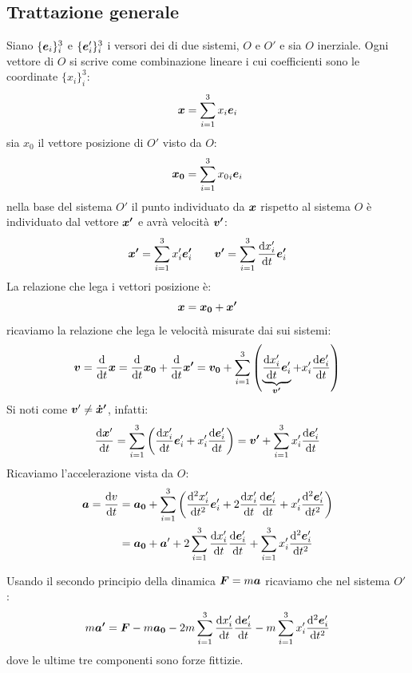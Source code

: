 \subsection{Trattazione generale}
Siano $\{\boldsymbol{e}_i\}_i^3$ e $\{\boldsymbol{e}'_i\}_i^3$ i versori dei di due sistemi, $O$ e $O'$ e sia $O$ inerziale. Ogni vettore di $O$ si scrive come combinazione lineare i cui coefficienti sono le coordinate $\{x_i\}_i^3$:
\[
  \boldsymbol{x}=\sum_{i=1}^3 x_i\boldsymbol{e}_i
\]
sia $x_0$ il vettore posizione di $O'$ visto da $O$:
\[
  \boldsymbol{x_0}=\sum_{i=1}^3 {x_0}_i \boldsymbol{e}_i
\]
nella base del sistema $O'$ il punto individuato da $\boldsymbol{x}$ rispetto al sistema $O$ è individuato dal vettore $\boldsymbol{x'}$ e avrà velocità $\boldsymbol{v'}$:
\[
  \boldsymbol{x'}=\sum_{i=1}^3 x'_i\boldsymbol{e'}_i \qquad \boldsymbol{v'}=\sum_{i=1}^3 \frac{\mathrm{d} x'_i}{\mathrm{d} t}\boldsymbol{e'}_i
\]
La relazione che lega i vettori posizione è:
\[
  \boldsymbol{x} = \boldsymbol{x_0}+\boldsymbol{x'}
\]
ricaviamo la relazione che lega le velocità misurate dai sui sistemi:
\begin{equation}
  \boldsymbol{v}=\frac{\mathrm{d}}{\mathrm{d} t}\boldsymbol{x}=\frac{\mathrm{d}}{\mathrm{d} t}\boldsymbol{x_0}+\frac{\mathrm{d}}{\mathrm{d} t}\boldsymbol{x'}=\boldsymbol{v_0}+\sum_{i=1}^3\left(\underbrace{\frac{\mathrm{d} x'_i}{\mathrm{d} t}\boldsymbol{e}'_i}_{\boldsymbol{v'}}+x'_i\frac{\mathrm{d} \boldsymbol{e}'_i}{\mathrm{d} t}\right)
  \label{eq:forze_apperenti_gen_v}
\end{equation}
Si noti come $\boldsymbol{v}'\neq \boldsymbol{\dot x'}$, infatti:
\[
  \frac{\mathrm{d}\boldsymbol{x}'}{\mathrm{d} t} = \sum_{i=1}^3\left(\frac{\mathrm{d} x'_i}{\mathrm{d} t}\boldsymbol{e}'_i+x'_i\frac{\mathrm{d} \boldsymbol{e}'_i}{\mathrm{d} t}\right) = \boldsymbol{v'} + \sum_{i=1}^3 x'_i\frac{\mathrm{d} \boldsymbol{e}'_i}{\mathrm{d} t}
\]
Ricaviamo l'accelerazione vista da $O$:
\begin{equation}
  \begin{split}
    \boldsymbol{a} = \frac{\mathrm{d} v}{\mathrm{d} t} &= \boldsymbol{a_0}+\sum_{i=1}^3\left(\frac{\mathrm{d}^2 x'_i}{\mathrm{d} t^2}\boldsymbol{e}'_i
    +2\frac{\mathrm{d} x'_i}{\mathrm{d} t}\frac{\mathrm{d} \boldsymbol{e}'_i}{\mathrm{d} t}
    +x'_i\frac{\mathrm{d}^2 \boldsymbol{e}'_i}{\mathrm{d} t^2}\right) \\
    &= \boldsymbol{a_0} + \boldsymbol{a}'
    +2\sum_{i=1}^3 \frac{\mathrm{d} x'_i}{\mathrm{d} t}\frac{\mathrm{d} \boldsymbol{e}'_i}{\mathrm{d} t} + \sum_{i=1}^3 x'_i\frac{\mathrm{d}^2 \boldsymbol{e}'_i}{\mathrm{d} t^2}
  \end{split}
  \label{eq:fittizie_gen_a}
\end{equation}

Usando il secondo principio della dinamica $\boldsymbol{F}=m\boldsymbol{a}$ ricaviamo che nel sistema $O'$:
\begin{equation}
  m \boldsymbol{a'} = \boldsymbol{F} - m\boldsymbol{a_0}
  -2m \sum_{i=1}^3 \frac{\mathrm{d} x'_i}{\mathrm{d} t}\frac{\mathrm{d} \boldsymbol{e}'_i}{\mathrm{d} t} -m \sum_{i=1}^3 x'_i\frac{\mathrm{d}^2 \boldsymbol{e}'_i}{\mathrm{d} t^2}
  \label{eq:fittizie_gen_f}
\end{equation}
dove le ultime tre componenti sono forze fittizie.

